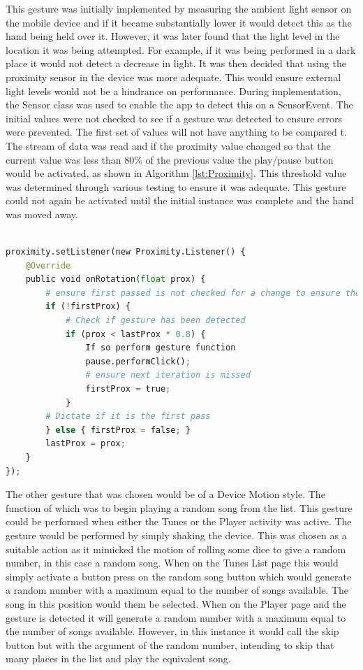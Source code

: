 \documentclass{l4proj}
\begin{document}
This gesture was initially implemented by measuring the ambient light sensor on the mobile device and if it became substantially lower it would detect this as the hand being held over it. However, it was later found that the light level in the location it was being attempted. For example, if it was being performed in a dark place it would not detect a decrease in light. It was then decided that using the proximity sensor in the device was more adequate. This would ensure external light levels would not be a hindrance on performance. During implementation, the Sensor class was used to enable the app to detect this on a SensorEvent. The initial values were not checked to see if a gesture was detected to ensure errors were prevented. The first set of values will not have anything to be compared t. The stream of data was read and if the proximity value changed so that the current value was less than 80\% of the previous value the play/pause button would be activated, as shown in Algorithm \ref{lst:Proximity}. This threshold value was determined through various testing to ensure it was adequate. This gesture could not again be activated until the initial instance was complete and the hand was moved away.

\begin{lstlisting}[language=python, float, caption={Java code detailing how the Pause/Play Gesture is detected and how it is acted upon.}, label=lst:Proximity]

proximity.setListener(new Proximity.Listener() {
    @Override
    public void onRotation(float prox) {
        # ensure first passed is not checked for a change to ensure there is a previous value to compare to
        if (!firstProx) {
            # Check if gesture has been detected
            if (prox < lastProx * 0.8) {
                If so perform gesture function
                pause.performClick();
                # ensure next iteration is missed
                firstProx = true;
            }
        # Dictate if it is the first pass
        } else { firstProx = false; }
        lastProx = prox;
    }
});
\end{lstlisting}

The other gesture that was chosen would be of a Device Motion style. The function of which was to begin playing a random song from the list. This gesture could be performed when either the Tunes or the Player activity was active. The gesture would be performed by simply shaking the device. This was chosen as a suitable action as it mimicked the motion of rolling some dice to give a random number, in this case a random song. When on the Tunes List page this would simply activate a button press on the random song button which would generate a random number with a maximum equal to the number of songs available. The song in this position would them be selected. When on the Player page and the gesture is detected it will generate a random number with a maximum equal to the number of songs available. However, in this instance it would call the skip button but with the argument of the random number, intending to skip that many places in the list and play the equivalent song.
\end{document}
